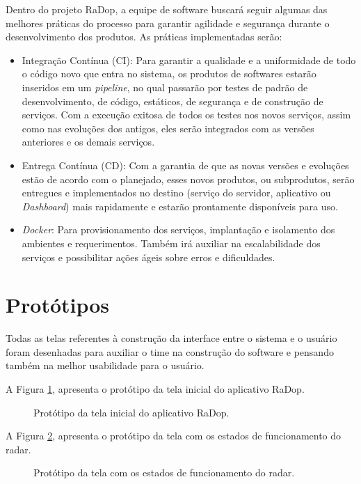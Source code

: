 Dentro do projeto RaDop, a equipe de software buscará seguir algumas das melhores práticas do processo para garantir agilidade e segurança durante o desenvolvimento dos produtos. As práticas implementadas serão:
\begin{itemize}
    \item Integração Contínua (CI): Para garantir a qualidade e a uniformidade de todo o código novo que entra no sistema, os produtos de softwares estarão inseridos em um \textit{pipeline}, no qual passarão por testes de padrão de desenvolvimento, de código, estáticos, de segurança e de construção de serviços. Com a execução exitosa de todos os testes nos novos serviços, assim como nas evoluções dos antigos, eles serão integrados com as versões anteriores e os demais serviços.
    \item Entrega Contínua (CD): Com a garantia de que as novas versões e evoluções estão de acordo com o planejado, esses novos produtos, ou subprodutos, serão entregues e implementados no destino (serviço do servidor, aplicativo ou \textit{Dashboard}) mais rapidamente e estarão prontamente disponíveis para uso.
    \item \textit{Docker}: Para provisionamento dos serviços, implantação e isolamento dos ambientes e requerimentos. Também irá auxiliar na escalabilidade dos serviços e possibilitar ações ágeis sobre erros e dificuldades.
\end{itemize}

\section{Protótipos}

Todas as telas referentes à construção da interface entre o sistema e o usuário foram desenhadas para auxiliar o time na construção do software e pensando também na melhor usabilidade para o usuário.

A Figura \ref{fig:tela_inicial}, apresenta o protótipo da tela inicial do aplicativo RaDop.

\begin{figure}[!h]
	\caption{\label{fig:tela_inicial} Protótipo da tela inicial do aplicativo RaDop.}
\end{figure}\newpage

A Figura \ref{fig:tela_status}, apresenta o protótipo da tela com os estados de funcionamento do radar.

\begin{figure}[!h]
	\caption{\label{fig:tela_status} Protótipo da tela com os estados de funcionamento do radar.}
\end{figure}

